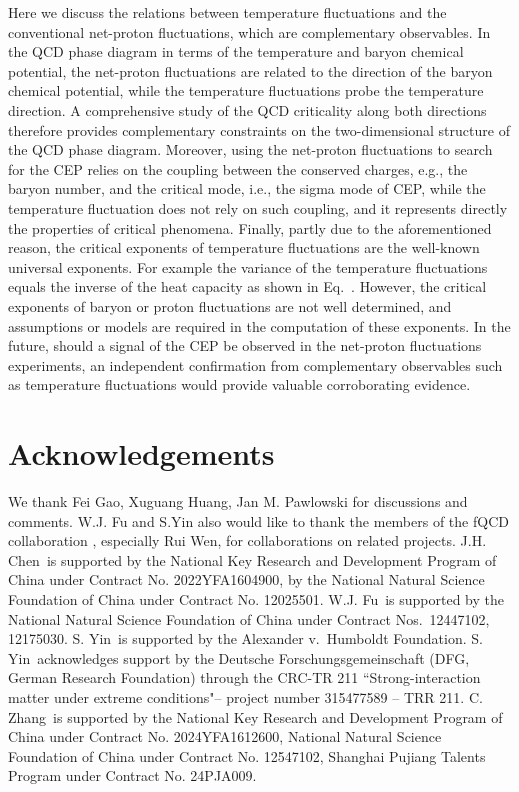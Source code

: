 \documentclass[aps,twocolumn,prd,superscriptaddress,nofootinbib,floatfix]{revtex4-2}
\def\Eq#1{Eq.~\labelcref{#1}}
\begin{document}
Here we discuss the relations between temperature fluctuations and the conventional net-proton fluctuations, which are complementary observables. In the QCD phase diagram in terms of the temperature and baryon chemical potential, the net-proton fluctuations are related to the direction of the baryon chemical potential, while the temperature fluctuations probe the temperature direction. A comprehensive study of the QCD criticality along both directions therefore provides complementary constraints on the two-dimensional structure of the QCD phase diagram. Moreover, using the net-proton fluctuations to search for the CEP relies on the coupling between the conserved charges, e.g., the baryon number, and the critical mode, i.e., the sigma mode of CEP, while the temperature fluctuation does not rely on such coupling, and it represents directly the properties of critical phenomena. Finally, partly due to the aforementioned reason, the critical exponents of temperature fluctuations are the well-known universal exponents. For example the variance of the temperature fluctuations equals the inverse of the heat capacity as shown in \Eq{eq:cn-chin}. However, the critical exponents of baryon or proton fluctuations are not well determined, and assumptions or models are required in the computation of these exponents. In the future, should a signal of the CEP be observed in the net-proton fluctuations experiments, an independent confirmation from complementary observables such as temperature fluctuations would provide valuable corroborating evidence.


\section*{Acknowledgements}

We thank Fei Gao,  Xuguang Huang, Jan M. Pawlowski for discussions and comments. W.J. Fu and S.Yin also would like to thank the members of the fQCD collaboration \cite{fQCD}, especially Rui Wen, for collaborations on related projects.
J.H. Chen\ is supported by the National Key Research and Development Program of China under Contract No. 2022YFA1604900, by the National Natural Science Foundation of China under Contract No. 12025501.
W.J. Fu\ is supported by the National Natural Science Foundation of China under Contract Nos.\ 12447102, 12175030. 
S. Yin\ is supported by the Alexander v.\ Humboldt Foundation. 
S. Yin\ acknowledges support by the Deutsche Forschungsgemeinschaft (DFG, German Research Foundation) through the CRC-TR 211 ``Strong-interaction matter under extreme conditions"– project number 315477589 – TRR 211.
C. Zhang\ is supported by the National Key Research and Development Program of China under Contract No. 2024YFA1612600, National Natural Science Foundation of China under Contract No. 12547102, Shanghai Pujiang Talents Program under Contract No. 24PJA009.
\end{document}
